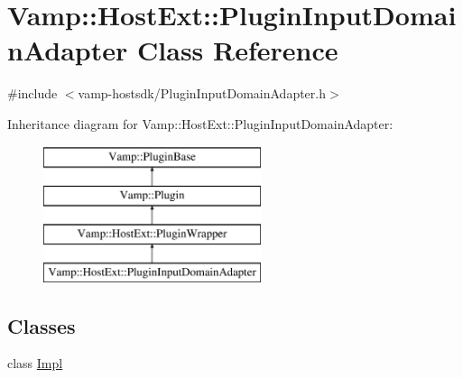 \hypertarget{class_vamp_1_1_host_ext_1_1_plugin_input_domain_adapter}{}\section{Vamp\+:\+:Host\+Ext\+:\+:Plugin\+Input\+Domain\+Adapter Class Reference}
\label{class_vamp_1_1_host_ext_1_1_plugin_input_domain_adapter}


{\ttfamily \#include $<$vamp-\/hostsdk/\+Plugin\+Input\+Domain\+Adapter.\+h$>$}

Inheritance diagram for Vamp\+:\+:Host\+Ext\+:\+:Plugin\+Input\+Domain\+Adapter\+:\begin{figure}[H]
\begin{center}
\leavevmode
\includegraphics[height=4.000000cm]{class_vamp_1_1_host_ext_1_1_plugin_input_domain_adapter}
\end{center}
\end{figure}
\subsection*{Classes}
\begin{DoxyCompactItemize}
\item 
class \hyperlink{class_vamp_1_1_host_ext_1_1_plugin_input_domain_adapter_1_1_impl}{Impl}
\end{DoxyCompactItemize}
